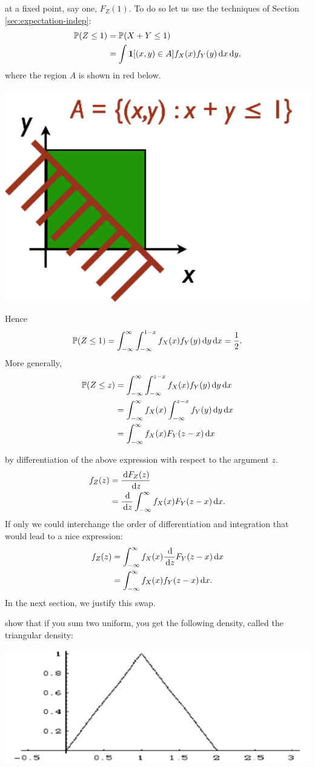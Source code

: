\documentclass{article}
\begin{document}
 at a fixed point, say one, $F_Z(1)$. To do so let us use the techniques of Section \ref{sec:expectation-indep}:
\begin{align*}
{\mathbb P}(Z \le 1) &= {\mathbb P}(X + Y \le 1) \\
 &= \int {\mathbf 1}[(x,y) \in A] f_X(x) f_Y(y) \,\mathrm{d} x \,\mathrm{d} y,
\end{align*}
where the region $A$ is shown in red below.
\begin{center}
	\includegraphics[width=0.3\linewidth]{figures/region} 
\end{center}
Hence 
\[ {\mathbb P}(Z \le 1) = \int_{-\infty}^\infty \int_{-\infty}^{1-x} f_X(x) f_Y(y) \,\mathrm{d} y \,\mathrm{d} x = \frac{1}{2}. \]
More generally,
\begin{align*}
{\mathbb P}(Z \le z) &= \int_{-\infty}^\infty \int_{-\infty}^{z-x} f_X(x) f_Y(y) \,\mathrm{d} y \,\mathrm{d} x \\
&= \int_{-\infty}^\infty f_X(x) \int_{-\infty}^{z-x}  f_Y(y) \,\mathrm{d} y \,\mathrm{d} x \\
&= \int_{-\infty}^\infty f_X(x) F_Y(z - x) \,\mathrm{d} x
\end{align*}

 by differentiation of the above expression with respect to the argument $z$. 
\begin{align*}
f_Z(z) &= \frac{\,\mathrm{d} F_Z(z)}{\,\mathrm{d} z} \\
&= \frac{\,\mathrm{d}}{\,\mathrm{d} z} \int_{-\infty}^\infty f_X(x) F_Y(z - x) \,\mathrm{d} x.
\end{align*}
If only we could interchange the order of differentiation and integration that would lead to a nice expression:
\begin{align*}
f_Z(z) &=
 \int_{-\infty}^\infty f_X(x) \frac{\,\mathrm{d}}{\,\mathrm{d} z} F_Y(z - x) \,\mathrm{d} x \\
  &=
  \int_{-\infty}^\infty f_X(x) f_Y(z - x) \,\mathrm{d} x.
\end{align*}
In the next section, we justify this swap.

 show that if you sum two uniform, you get the following density, called the triangular density:
\begin{center}
	\includegraphics[width=0.3\linewidth]{figures/triangular} 
\end{center}
\end{document}

